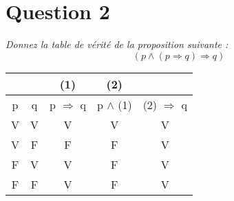 \section*{Question 2}
\noindent
\emph{Donnez la table de vérité de la proposition suivante :}
\[(p \wedge (p \Rightarrow q) \Rightarrow q)\]

\smallskip
\begin{center}
	\begin{tabular}{|cc|c|c|c|}
		\multicolumn{2}{c}{} & \multicolumn{1}{c}{(1)} & \multicolumn{1}{c}{(2)} &  \multicolumn{1}{c}{}\\ \hline
		p &        q         &    p $\Rightarrow$ q    &     p $\wedge$ (1)      & (2) $\Rightarrow$ q \\ \hline
		V &        V         &            V            &            V            &          V          \\ \hline
		V &        F         &            F            &            F            &          V          \\ \hline
		F &        V         &            V            &            F            &          V          \\ \hline
		F &        F         &            V            &            F            &          V          \\ \hline
	\end{tabular}
\end{center}
